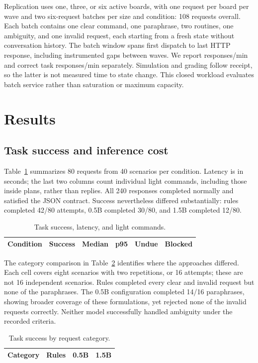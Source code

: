 \documentclass[letterpaper,conference]{IEEEtran}
\providecommand{\StudyPrefix}{}
\begin{document}
Replication uses one, three, or six active boards, with one request per board per wave and two six-request batches per size and condition: 108 requests overall. Each batch contains one clear command, one paraphrase, two routines, one ambiguity, and one invalid request, each starting from a fresh state without conversation history. The batch window spans first dispatch to last HTTP response, including instrumented gaps between waves. We report responses/min and correct task responses/min separately. Simulation and grading follow receipt, so the latter is not measured time to state change. This closed workload evaluates batch service rather than saturation or maximum capacity.

\section{Results}
\subsection{Task success and inference cost}
Table~\ref{tab:quality} summarizes 80 requests from 40 scenarios per condition. Latency is in seconds; the last two columns count individual light commands, including those inside plans, rather than replies. All 240 responses completed normally and satisfied the JSON contract. Success nevertheless differed substantially: rules completed 42/80 attempts, 0.5B completed 30/80, and 1.5B completed 12/80.
\begin{table}[t]\caption{Task success, latency, and light commands.}
\centering\footnotesize\setlength{\tabcolsep}{4pt}\begin{tabular}{lrrrrr}\toprule
Condition & Success & Median & p95 & Undue & Blocked\\\midrule

\end{tabular}\label{tab:quality}\end{table}

The category comparison in Table~\ref{tab:categories} identifies where the approaches differed. Each cell covers eight scenarios with two repetitions, or 16 attempts; these are not 16 independent scenarios. Rules completed every clear and invalid request but none of the paraphrases. The 0.5B configuration completed 14/16 paraphrases, showing broader coverage of these formulations, yet rejected none of the invalid requests correctly. Neither model successfully handled ambiguity under the recorded criteria.
\begin{table}[t]\caption{Task success by request category.}
\centering\footnotesize\begin{tabular}{lrrr}\toprule
Category & Rules & 0.5B & 1.5B\\\midrule

\end{tabular}\label{tab:categories}\end{table}
\end{document}
